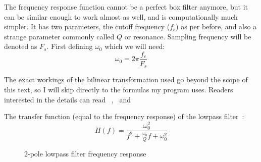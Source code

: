 \documentclass[11pt,a4paper]{article}
\begin{document}
The frequency response function cannot be a perfect box filter anymore, but it can be similar enough to work almost as well, and is computationally much simpler.
It has two parameters, the cutoff frequency (\(f_c\)) as per before, and also a strange parameter commonly called \(Q\) or resonance.
Sampling frequency will be denoted as \(F_s\).
First defining $\omega_0$ which we will need:
\begin{equation}
\omega_0 = 2{\pi}\frac{f_c}{F_s}
\end{equation}

The exact workings of the bilinear transformation used go beyond the scope of this text, so I will skip directly to the formulas my program uses. Readers interested in the details can read ~\cite[chap. 33]{SmithDSP},~\cite[chap. 3.5]{ZoranDFD} and~\cite{Cookbook}

The transfer function (equal to the frequency response) of the lowpass filter~\cite[section 8.2]{LinearCircuit}:
\begin{equation}
H(f) = \frac{\omega_0^2}{f^2 + \frac{\omega_0}{Q}f + \omega_0^2}
\end{equation}



\begin{figure}[ht]
\caption{2-pole lowpass filter frequency response}
\centering
{}

\end{figure}
\end{document}
